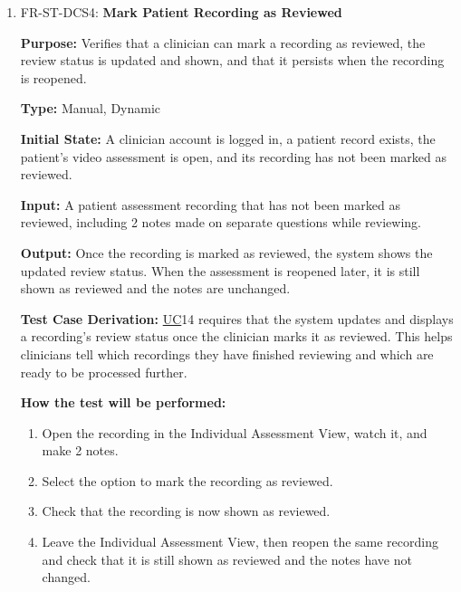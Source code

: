 \documentclass[12pt, titlepage]{article}
\newcommand{\srsuc}[1]{\href{https://github.com/Nour-Fawaz/MacaBoca/blob/main/pdfs/SRS/SRS.pdf}{UC}}
\renewcommand{\_}{\oldunderscore\allowbreak}
\begin{document}
\begin{enumerate}
  \item FR-ST-DCS4: \textbf{Mark Patient Recording as Reviewed\\}
  \begin{mdframed}[linewidth=0.5mm]
      \textbf{Purpose:} Verifies that a clinician can mark a recording as reviewed, the review status is updated and shown, and that it persists when the recording is reopened.\par
      \textbf{Type:} Manual, Dynamic \par
      \textbf{Initial State:} A clinician account is logged in, a patient record exists, the patient’s video assessment is open, and its recording has not been marked as reviewed. \par
      \textbf{Input:} A patient assessment recording that has not been marked as reviewed, including 2 notes made on separate questions while reviewing. \par
      \textbf{Output:} Once the recording is marked as reviewed, the system shows the updated review status. When the assessment is reopened later, it is still shown as reviewed and the notes are unchanged. \par
      \textbf{Test Case Derivation:} \srsuc*{14} requires that the system updates and displays a recording's review status once the clinician marks it as reviewed. This helps clinicians tell which recordings they have finished reviewing and which are ready to be processed further. \par
      \textbf{How the test will be performed:}
      \begin{enumerate}
          \item[1.] Open the recording in the Individual Assessment View, watch it, and make 2 notes.
          \item[2.] Select the option to mark the recording as reviewed.
          \item[3.] Check that the recording is now shown as reviewed.
          \item[4.] Leave the Individual Assessment View, then reopen the same recording and check that it is still shown as reviewed and the notes have not changed.
      \end{enumerate}
  \end{mdframed}
\end{enumerate}
\end{document}
